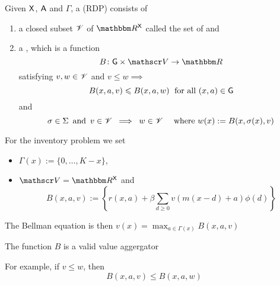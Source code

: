 \begin{frame}
    
    Given $\mathsf X$, $\mathsf A$ and $\Gamma$, a  (RDP) consists of
    
    \begin{enumerate}
        \item a closed subset $\mathscr V$ of $\RR^\Xsf$ called the set of
             and
        \vspace{0.5em}
        \item a  , which is a function
                \begin{equation*}
                    B \colon \Gsf \times \vV \to \RR
                \end{equation*}
              satisfying $v, w \in \mathscr V$ and $v \leq w \implies$
              \vspace{0.5em}
              \begin{equation*}
                B(x, a, v) \leqslant B(x, a, w) \; \text{ for all $(x, a) \in \mathsf G$}
              \end{equation*}
              and 
                \begin{equation*}
                    \sigma \in \Sigma 
                    \, \text{ and } \,
                    v \in \mathscr V
                    \; \implies \;
                    w \in \mathscr V
                    \quad \text{ where }
                    w(x) := B(x, \sigma(x), v)
                \end{equation*}
    \end{enumerate}

\end{frame}


\begin{frame}
    

    \Eg For the inventory problem we set 
    \begin{itemize}
        \item $\Gamma(x) := \{0, \ldots, K - x\}$,
        \item $\vV = \RR^\Xsf$ and
        \begin{equation*}
            B(x, a, v) :=
            \left\{
                r(x, a)
                + \beta
                \sum_{d \geq 0} v(m(x - d) + a) \phi(d)
            \right\}
        \end{equation*}
    \end{itemize}

    The Bellman equation is then $v(x) = \max_{a \in \Gamma(x)} B(x, a, v)$ 

    The function $B$ is a valid value aggergator

    For example, if $v \leq w$, then
    \begin{equation*}
        B(x, a, v) \leq B(x, a, w)
    \end{equation*}

\end{frame}


